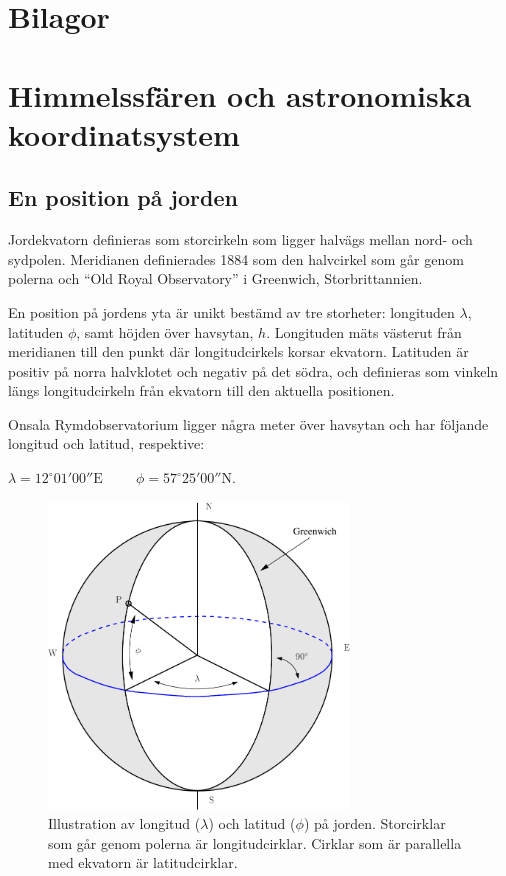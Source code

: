 \chapter*{Bilagor}
\appendix

\chapter{Himmelssfären och astronomiska koordinatsystem}
\label{app:coord}

\section{En position på jorden}

Jordekvatorn definieras som storcirkeln som ligger halvägs mellan
nord- och sydpolen. Meridianen definierades 1884 som den halvcirkel
som går genom polerna och ``Old Royal Observatory'' i Greenwich,
Storbrittannien. 

En position på jordens yta är unikt bestämd av tre storheter:
longituden $\lambda$, latituden $\phi$, samt höjden över havsytan,
$h$. Longituden mäts västerut från meridianen till den punkt där
longitudcirkels korsar ekvatorn. Latituden är positiv på norra
halvklotet och negativ på det södra, och definieras som vinkeln längs
longitudcirkeln från ekvatorn till den aktuella positionen.

Onsala Rymdobservatorium ligger några meter över havsytan och har
följande longitud och latitud, respektive:

\begin{center}
${{\boxed{\lambda=12^{\circ}01'00'' \text{E}
\hspace{1cm}\phi=57^{\circ}25'00''\text{N.} }}}$
\end{center}  

\begin{figure}[ht]
\begin{center}
\includegraphics[width=8cm]{../figures/longlat.pdf}
\end{center}
\caption{Illustration av longitud ($\lambda$) och latitud ($\phi$) på
  jorden. Storcirklar som går genom polerna är
  longitudcirklar. Cirklar som är parallella med ekvatorn är
  latitudcirklar. }
\label{figearth}
\end{figure}


